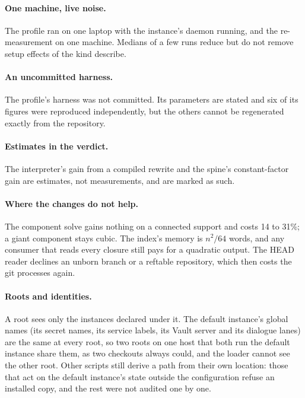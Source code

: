 \documentclass[11pt]{article}
\theoremstyle{plain}
\theoremstyle{definition}
\theoremstyle{remark}
\begin{document}
\paragraph{One machine, live noise.} The profile ran on one laptop with the instance's daemon
running, and the re-measurement on one machine. Medians of a few runs reduce but do not remove
setup effects of the kind \citet{mytkowicz2009} describe.

\paragraph{An uncommitted harness.} The profile's harness was not committed. Its parameters are
stated and six of its figures were reproduced independently, but the others cannot be regenerated
exactly from the repository.

\paragraph{Estimates in the verdict.} The interpreter's gain from a compiled rewrite and the spine's
constant-factor gain are estimates, not measurements, and are marked as such.

\paragraph{Where the changes do not help.} The component solve gains nothing on a connected
support and costs 14 to 31\%; a giant component stays cubic. The index's memory is $n^2/64$ words,
and any consumer that reads every closure still pays for a quadratic output. The HEAD reader declines
an unborn branch or a reftable repository, which then costs the git processes again.

\paragraph{Roots and identities.} A root sees only the instances declared under it. The default
instance's global names (its secret names, its service labels, its Vault server and its dialogue
lanes) are the same at every root, so two roots on one host that both run the default instance share
them, as two checkouts always could, and the loader cannot see the other root. Other scripts still
derive a path from their own location: those that act on the default instance's state outside the
configuration refuse an installed copy, and the rest were not audited one by one.
\end{document}

